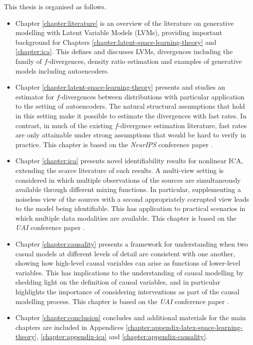 This thesis is organised as follows.

\begin{itemize}
\item Chapter \ref{chapter:literature} is an overview of the literature on generative modelling with Latent Variable Models (LVMs), providing important background for Chapters \ref{chapter:latent-space-learning-theory} and \ref{chapter:ica}. 
This defines and discusses LVMs, divergences including the family of $f$-divergences, density ratio estimation and examples of generative models including autoencoders.
\item Chapter \ref{chapter:latent-space-learning-theory} presents and studies an estimator for $f$-divergences between distributions with particular application to the setting of autoencoders. 
The natural structural assumptions that hold in this setting make it possible to estimate the divergences with fast rates.
In contrast, in much of the existing $f$-divergence estimation literature, fast rates are only attainable under strong assumptions that would be hard to verify in practice.
This chapter is based on the \emph{NeurIPS} conference paper \cite{rubenstein2019practical}.
\item Chapter \ref{chapter:ica} presents novel identifiability results for nonlinear ICA, extending the scarce literature of such results. 
A multi-view setting is considered in which multiple observations of the sources are simultaneously available through different mixing functions.
In particular, supplementing a noiseless view of the sources with a second appropriately corrupted view leads to the model being identifiable.
This has application to practical scenarios in which multiple data modalities are available.
This chapter is based on the \emph{UAI} conference paper \cite{gresele2019incomplete}.
\item Chapter \ref{chapter:causality} presents a framework for understanding when two casual models at different levels of detail are consistent with one another, showing how high-level causal variables can arise as functions of lower-level variables.
This has implications to the understanding of causal modelling by shedding light on the definition of causal variables, and in particular highlights the importance of considering interventions as part of the causal modelling process.
This chapter is based on the \emph{UAI} conference paper \cite{rubenstein2017causal}.
\item Chapter \ref{chapter:conclusion} concludes and additional materials for the main chapters are included in Appendices \ref{chapter:appendix-latex-space-learning-theory}, \ref{chapter:appendix-ica} and \ref{chapter:appendix-causality}.
\end{itemize}

